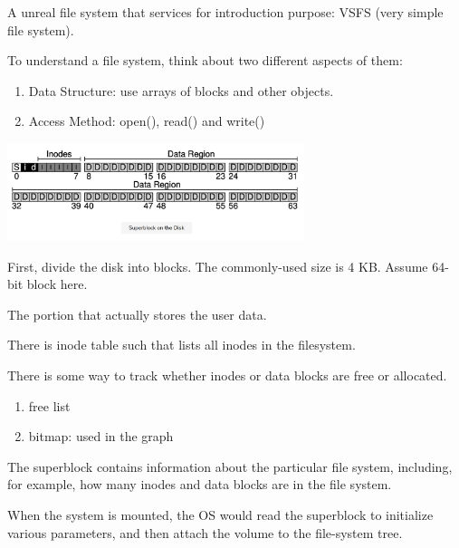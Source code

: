 
        A unreal file system that services for introduction purpose: VSFS (very simple file system).

        To understand a file system, think about two different aspects of them:
        \begin{enumerate}
            \item Data Structure: use arrays of blocks and other objects.
            \item Access Method: open(), read() and write()
        \end{enumerate}

    \includegraphics[width=0.65\textwidth]{chapters/Persistence/persistence/Overall_Organization.png}


        First, divide the disk into blocks. The commonly-used size is 4 KB.
        Assume 64-bit block here.


        The portion that actually stores the user data.


        There is inode table such that lists all inodes in the filesystem.

        
     There is some way to track whether inodes or data blocks are free or allocated.
    
     \begin{enumerate}
         \item free list 
         \item bitmap: used in the graph
     \end{enumerate}



        The superblock contains information about the particular file system,
        including, for example, how many inodes and data blocks are in the 
        file system.

        When the system is mounted, the OS would read the superblock to initialize
        various parameters, and then attach the volume to the file-system tree.
    
